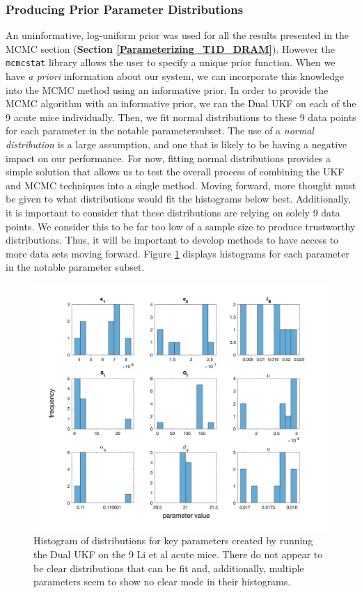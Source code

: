 \subsubsection{Producing Prior Parameter Distributions}
An uninformative, log-uniform prior was used for all the results presented in the MCMC section (\textbf{Section \ref{Parameterizing_T1D_DRAM}}). However the \texttt{mcmcstat} library allows the user to specify a unique prior function. When we have \textit{a priori} information about our system, we can incorporate this knowledge into the MCMC method using an informative prior. In order to provide the MCMC algorithm with an informative prior, we ran the Dual UKF on each of the 9 acute mice individually. Then, we fit normal distributions to these 9 data points for each parameter in the notable parametersubset. The use of a \emph{normal distribution} is a large assumption, and one that is likely to be having a negative impact on our performance. For now, fitting normal distributions provides a simple solution that allows us to test the overall process of combining the UKF and MCMC techniques into a single method. Moving forward, more thought must be given to what distributions would fit the histograms below best. Additionally, it is important to consider that these distributions are relying on solely 9 data points. We consider this to be far too low of a sample size to produce trustworthy distributions. Thus, it will be important to develop methods to have access to more data sets moving forward. Figure \ref{fig:3disc} displays histograms for each parameter in the notable parameter subset.

\begin{figure}[H]
    \centering
    \includegraphics[width=15cm]{Comparison_Figures/Key_Parameter_Distributions_HistogramsFromDualFit.jpg}
    \caption{Histogram of distributions for key parameters created by running the Dual UKF on the 9 Li et al acute mice. There do not appear to be clear distributions that can be fit and, additionally, multiple parameters seem to show no clear mode in their histograms.}
    \label{fig:3disc}
\end{figure}

